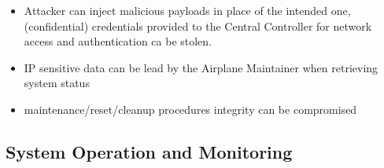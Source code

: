 \begin{itemize}
	\item Attacker can inject malicious payloads in place of the intended one, (confidential) credentials provided
	      to the Central Controller for network access and authentication ca be stolen.
	\item IP sensitive data can be lead by the Airplane Maintainer when retrieving system status
	\item maintenance/reset/cleanup procedures integrity can be compromised
\end{itemize}


\subsection{System Operation and Monitoring}
